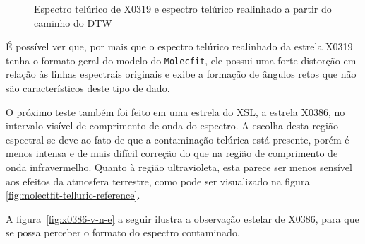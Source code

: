 \begin{figure}[htb]
  \centering
  \hfill
  \caption{Espectro telúrico de X0319 e espectro telúrico realinhado a partir do caminho do DTW}
  \label{fig:x0319-realigned-telluric}
\end{figure}

É possível ver que, por mais que o espectro telúrico realinhado da estrela X0319 tenha o formato geral do modelo do \texttt{Molecfit}, ele possui uma forte distorção em relação às linhas espectrais originais e exibe a formação de ângulos retos que não são característicos deste tipo de dado.

O próximo teste também foi feito em uma estrela do XSL, a estrela X0386, no intervalo visível de comprimento de onda do espectro. A escolha desta região espectral se deve ao fato de que a contaminação telúrica está presente, porém é menos intensa e de mais difícil correção do que na região de comprimento de onda infravermelho. Quanto à região ultravioleta, esta parece ser menos sensível aos efeitos da atmosfera terrestre, como pode ser visualizado na figura \ref{fig:molectfit-telluric-reference}.

A figura~\ref{fig:x0386-v-n-e} a seguir ilustra a observação estelar de X0386, para que se possa perceber o formato do espectro contaminado.

